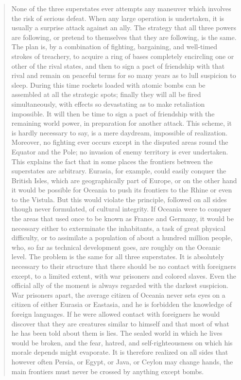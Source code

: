 \begin{quotation}
None of the three superstates ever attempts any maneuver which involves
the risk of serious defeat. When any large operation is undertaken, it
is usually a surprise attack against an ally. The strategy that all
three powers are following, or pretend to themselves that they are
following, is the same. The plan is, by a combination of fighting,
bargaining, and well-timed strokes of treachery, to acquire a ring of
bases completely encircling one or other of the rival states, and then
to sign a pact of friendship with that rival and remain on peaceful
terms for so many years as to lull suspicion to sleep. During this time
rockets loaded with atomic bombs can be assembled at all the strategic
spots; finally they will all be fired simultaneously, with effects so
devastating as to make retaliation impossible. It will then be time to
sign a pact of friendship with the remaining world power, in preparation
for another attack. This scheme, it is hardly necessary to say, is a
mere daydream, impossible of realization. Moreover, no fighting ever
occurs except in the disputed areas round the Equator and the Pole; no
invasion of enemy territory is ever undertaken. This explains the fact
that in some places the frontiers between the superstates are arbitrary.
Eurasia, for example, could easily conquer the British Isles, which are
geographically part of Europe, or on the other hand it would be possible
for Oceania to push its frontiers to the Rhine or even to the Vistula.
But this would violate the principle, followed on all sides though never
formulated, of cultural integrity. If Oceania were to conquer the areas
that used once to be known as France and Germany, it would be necessary
either to exterminate the inhabitants, a task of great physical
difficulty, or to assimilate a population of about a hundred million
people, who, so far as technical development goes, are roughly on the
Oceanic level. The problem is the same for all three superstates. It is
absolutely necessary to their structure that there should be no contact
with foreigners except, to a limited extent, with war prisoners and
colored slaves. Even the official ally of the moment is always regarded
with the darkest suspicion. War prisoners apart, the average citizen of
Oceania never sets eyes on a citizen of either Eurasia or Eastasia, and
he is forbidden the knowledge of foreign languages. If he were allowed
contact with foreigners he would discover that they are creatures
similar to himself and that most of what he has been told about them is
lies. The sealed world in which he lives would be broken, and the fear,
hatred, and self-righteousness on which his morale depends might
evaporate. It is therefore realized on all sides that however often
Persia, or Egypt, or Java, or Ceylon may change hands, the main
frontiers must never be crossed by anything except bombs.
\end{quotation}

